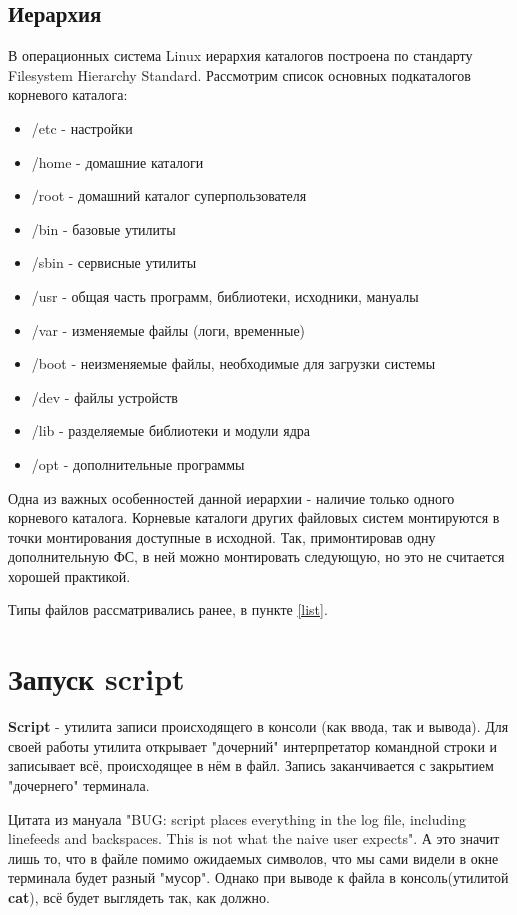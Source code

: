 \documentclass[a4paper]{article}
\begin{document}
\subsection{Иерархия}
В операционных система Linux иерархия каталогов построена по стандарту Filesystem Hierarchy Standard. Рассмотрим список основных подкаталогов корневого каталога:
\begin{itemize}
\item /etc - настройки
\item /home - домашние каталоги
\item /root - домашний каталог суперпользователя
\item /bin - базовые утилиты
\item /sbin - сервисные утилиты
\item /usr - общая часть программ, библиотеки, исходники, мануалы
\item /var - изменяемые файлы (логи, временные)
\item /boot - неизменяемые файлы, необходимые для загрузки системы
\item /dev - файлы устройств
\item /lib - разделяемые библиотеки и модули ядра
\item /opt - дополнительные программы
\end{itemize}

Одна из важных особенностей данной иерархии - наличие только одного корневого каталога. Корневые каталоги других файловых систем монтируются в точки монтирования доступные в исходной. Так, примонтировав одну дополнительную ФС, в ней можно монтировать следующую, но это не считается хорошей практикой.

Типы файлов рассматривались ранее, в пункте \ref{list}.

\section{Запуск script}
\textbf{Script} - утилита записи происходящего в консоли (как ввода, так и вывода). Для своей работы утилита открывает "дочерний"  интерпретатор командной строки и записывает всё, происходящее в нём в файл. Запись заканчивается с закрытием "дочернего" терминала. 

Цитата из мануала "BUG: script places everything in the log file, including linefeeds and backspaces.  This is not what the naive user expects". А это значит лишь то, что в файле помимо ожидаемых символов, что мы сами видели в окне терминала будет разный "мусор". Однако при выводе к файла в консоль(утилитой \textbf{cat}), всё будет выглядеть так, как должно.
\end{document}
